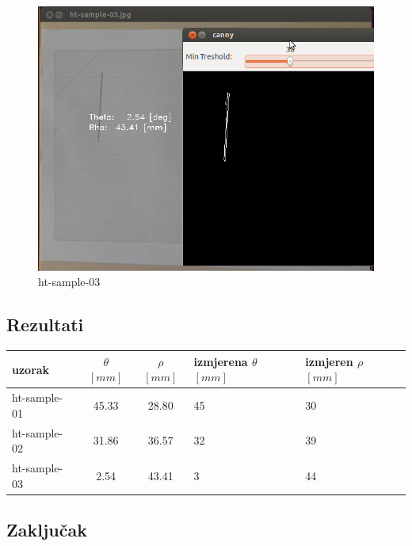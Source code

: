 \begin{figure}[h]
\centering
\includegraphics[scale=0.32]{images/lab3-sample-03.png}
\caption{ht-sample-03}
\label{fig:lab3-sample-03}
\end{figure}

\subsection{Rezultati}

\begin{center}
\centering
\begin{tabular}
{ l || c | c | p{1.6 cm} | p{1.6 cm}  }
{uzorak}  & {\(\theta\) $[mm]$ } & {\(\rho \) $[mm]$} & {izmjerena \(\theta\) $[mm]$} & {izmjeren \(\rho\) $[mm]$} \\ \hline
ht-sample-01 & 45.33 & 28.80 & 45 & 30 \\ \hline
ht-sample-02 & 31.86 & 36.57 & 32 & 39 \\ \hline
ht-sample-03 & 2.54 & 43.41 & 3 & 44 \\ 
\end{tabular}
\end{center}

\newpage
\subsection{Zaključak}


